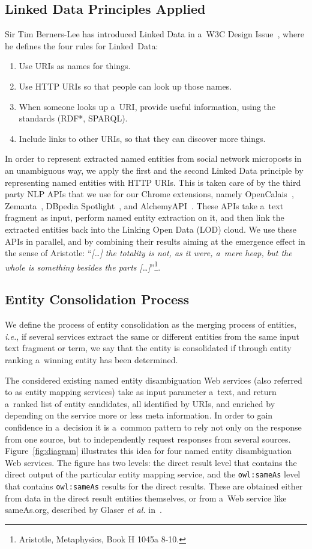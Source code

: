 \subsection{Linked Data Principles Applied}
Sir Tim Berners-Lee has introduced Linked Data in a~W3C Design Issue~\cite{TimBL:LinkedData}, where he defines the four rules for Linked~Data:
\begin{enumerate}
\item Use URIs as names for things.
\item Use HTTP URIs so that people can look up those names.
\item When someone looks up a~URI, provide useful information, using the standards (RDF*, SPARQL).
\item Include links to other URIs, so that they can discover more things.
\end{enumerate}
In order to represent extracted named entities from social network microposts in an unambiguous way, we apply the first and the second Linked Data principle by representing named entities with HTTP URIs. This is taken care of by the third party NLP APIs that we use for our Chrome extensions, namely OpenCalais~\cite{OpenCalais}, Zemanta~\cite{Zemanta}, DBpedia Spotlight~\cite{spotlight}, and AlchemyAPI~\cite{AlchemyAPI}. These APIs take a~text fragment as input, perform named entity extraction on it, and then link the extracted entities back into the Linking Open Data (LOD) cloud. We use these APIs in parallel, and by combining their results aiming at the emergence effect in the sense of Aristotle: ``\emph{[\ldots] the totality is not, as it were, a~mere heap, but the whole is something besides the parts [\ldots]}''\footnote{Aristotle, Metaphysics, Book H 1045a 8-10.}. 

\subsection{Entity Consolidation Process}
We define the process of entity consolidation as the merging process of entities, \emph{i.e.}, if several services extract the same or different
entities from the same input text fragment or term, we say that the entity is consolidated if through entity ranking a~winning entity has been determined.

The considered existing named entity disambiguation Web services (also referred to as entity mapping services) take as input parameter a~text, and return a~ranked list of entity
candidates, all identified by URIs, and enriched by depending on the service more or less meta information. In order to
gain confidence in a~decision it is a~common pattern to rely not only on the response from one source, but to
independently request responses from several sources. Figure~\ref{fig:diagram} illustrates this idea for four named entity disambiguation Web services. The figure has two levels: the direct result level that contains the direct output of the 
particular entity mapping service, and the \texttt{owl:sameAs} level that contains \texttt{owl:sameAs} results for the
direct results. These are obtained either from data in the direct result entities themselves, or from a~Web service
like sameAs.org, described by Glaser \emph{et al.} in~\cite{Glaser:SameAs}.

